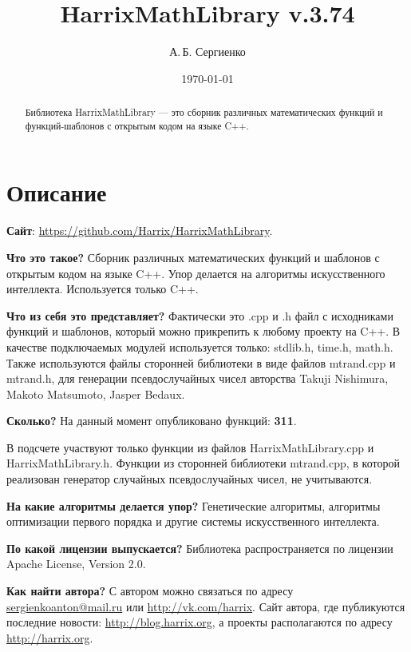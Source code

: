 \documentclass[a4paper,12pt]{article}
\title{HarrixMathLibrary v.3.74}
\author{А.\,Б. Сергиенко}
\date{\today}
\begin{document}


\maketitle

\begin{abstract}
Библиотека HarrixMathLibrary --- это сборник различных математических функций и функций-шаблонов с открытым кодом на языке C++.
\end{abstract}

\tableofcontents

\newpage

\section{Описание}

\textbf{Сайт}: \href{https://github.com/Harrix/HarrixMathLibrary}{https://github.com/Harrix/HarrixMathLibrary}.

\textbf{Что это такое?} Сборник различных математических функций и шаблонов с открытым кодом на языке C++. Упор делается на алгоритмы искусственного интеллекта. Используется только C++.

\textbf{Что из себя это представляет?} Фактически это .cpp и .h файл с исходниками функций и шаблонов, который можно прикрепить к любому проекту на C++. В качестве подключаемых модулей используется только: stdlib.h, time.h, math.h. Также используются файлы сторонней библиотеки в виде файлов mtrand.cpp и mtrand.h, для генерации псевдослучайных чисел авторства Takuji Nishimura, Makoto Matsumoto, Jasper Bedaux.

\textbf{Сколько?} На данный момент опубликовано функций: \textbf{311}.

В подсчете участвуют только функции из файлов HarrixMathLibrary.cpp и HarrixMathLibrary.h. Функции из сторонней библиотеки mtrand.cpp, в которой реализован генератор случайных псевдослучайных чисел, не учитываются.

\textbf{На какие алгоритмы делается упор?} Генетические алгоритмы, алгоритмы оптимизации первого порядка и другие системы искусственного интеллекта.

\textbf{По какой лицензии выпускается?} Библиотека распространяется по лицензии Apache License, Version 2.0.

\textbf{Как найти автора?} С автором можно связаться по адресу \href {mailto:sergienkoanton@mail.ru} {sergienkoanton@mail.ru} или  \href {http://vk.com/harrix} {http://vk.com/harrix}. Сайт автора, где публикуются последние новости: \href {http://blog.harrix.org} {http://blog.harrix.org}, а проекты располагаются по адресу \href {http://harrix.org} {http://harrix.org}.
\end{document}
